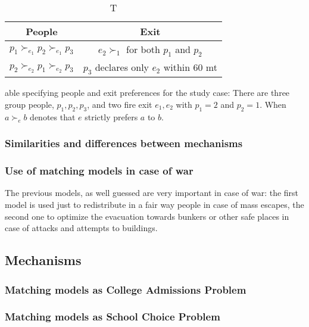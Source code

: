 \documentclass[letterpaper]{article} %
\begin{document}
\begin{table}[!htb]
    \begin{tabular}{c|c}
        \hline People & Exit \\
        \hline\( p_{1} \succ_{e_{1}} p_{2} \succ_{e_{1}} p_{3} \) & \( e_{2} \succ_{1} \) for both \( p_{1} \) and \( p_{2} \) \\
        \( p_{2} \succ_{e_{2}} p_{1} \succ_{e_{2}} p_{3} \) & \( p_{3} \) declares only \( e_{2} \) within 60 mt \\
        \hline
    \end{tabular}
    \caption Table specifying people and exit preferences for
    the study case: There are three group people, \( p _ { 1 } , p _ { 2 } , p _ { 3 } \), and two fire exit \( e _ { 1 } , e _ { 2 } \) with \( p _ { 1 } = 2 \) and \( p _ { 2 } = 1 \).
    When \( a \succ_{e} b \) denotes that \( e \) strictly prefers \( a \) to \( b \).
    \label{tab:people-exit}
\end{table}

\subsubsection{Similarities and differences between mechanisms}

\subsubsection{Use of matching models in case of war}

The previous models, as well guessed are very important in case of war: the first model is used just 
to redistribute in a fair way people in case of mass escapes, the second one to optimize the evacuation 
towards bunkers or other safe places in case of attacks and attempts to buildings.

\cite{delacretaz_2020} 

\subsection{Mechanisms}


\subsubsection{Matching models as College Admissions Problem}



\cite{basshuysen} 

\subsubsection{Matching models as School Choice Problem}
\end{document}
